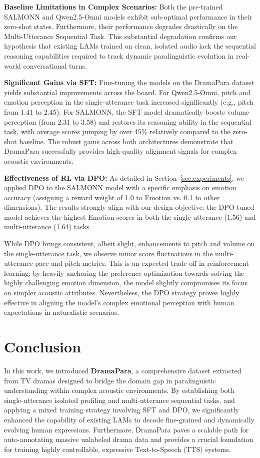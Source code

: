 \documentclass{Interspeech}
\begin{document}
\textbf{Baseline Limitations in Complex Scenarios:} 
Both the pre-trained SALMONN and Qwen2.5-Omni models exhibit sub-optimal performance in their zero-shot states. Furthermore, their performance degrades drastically on the Multi-Utterance Sequential Task. This substantial degradation confirms our hypothesis that existing LAMs trained on clean, isolated audio lack the sequential reasoning capabilities required to track dynamic paralinguistic evolution in real-world conversational turns.

\textbf{Significant Gains via SFT:} 
Fine-tuning the models on the DramaPara dataset yields substantial improvements across the board. For Qwen2.5-Omni, pitch and emotion perception in the single-utterance task increased significantly (e.g., pitch from 1.41 to 2.45). For SALMONN, the SFT model dramatically boosts volume perception (from 2.31 to 3.58) and restores its reasoning ability in the sequential task, with average scores jumping by over 45\% relatively compared to the zero-shot baseline. The robust gains across both architectures demonstrate that DramaPara successfully provides high-quality alignment signals for complex acoustic environments.

\textbf{Effectiveness of RL via DPO:}
As detailed in Section~\ref{sec:experiments}, we applied DPO to the SALMONN model with a specific emphasis on emotion accuracy (assigning a reward weight of 1.0 to Emotion vs. 0.1 to other dimensions). The results strongly align with our design objective: the DPO-tuned model achieves the highest Emotion scores in both the single-utterance (1.56) and multi-utterance (1.64) tasks. 

While DPO brings consistent, albeit slight, enhancements to pitch and volume on the single-utterance task, we observe minor score fluctuations in the multi-utterance pace and pitch metrics. This is an expected trade-off in reinforcement learning; by heavily anchoring the preference optimization towards solving the highly challenging emotion dimension, the model slightly compromises its focus on simpler acoustic attributes. Nevertheless, the DPO strategy proves highly effective in aligning the model's complex emotional perception with human expectations in naturalistic scenarios.

\section{Conclusion}
\label{sec:conclusion}

In this work, we introduced \textbf{DramaPara}, a comprehensive dataset extracted from TV dramas designed to bridge the domain gap in paralinguistic understanding within complex acoustic environments. By establishing both single-utterance isolated profiling and multi-utterance sequential tasks, and applying a mixed training strategy involving SFT and DPO, we significantly enhanced the capability of existing LAMs to decode fine-grained and dynamically evolving human expressions. Furthermore, DramaPara paves a scalable path for auto-annotating massive unlabeled drama data and provides a crucial foundation for training highly controllable, expressive Text-to-Speech (TTS) systems.
\end{document}
